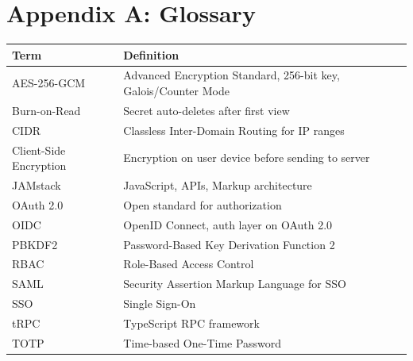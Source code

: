 \documentclass[12pt,a4paper]{article}
\begin{document}
\appendix
\section*{Appendix A: Glossary}

\begin{table}[H]
  \centering
  \small
  \begin{tabular}{@{}p{3.5cm}p{10cm}@{}}
    \toprule
    \textbf{Term}          & \textbf{Definition}                                            \\
    \midrule
    AES-256-GCM            & Advanced Encryption Standard, 256-bit key, Galois/Counter Mode \\
    \hline
    Burn-on-Read           & Secret auto-deletes after first view                           \\
    \hline
    CIDR                   & Classless Inter-Domain Routing for IP ranges                   \\
    \hline
    Client-Side Encryption & Encryption on user device before sending to server             \\
    \hline
    JAMstack               & JavaScript, APIs, Markup architecture                          \\
    \hline
    OAuth 2.0              & Open standard for authorization                                \\
    \hline
    OIDC                   & OpenID Connect, auth layer on OAuth 2.0                        \\
    \hline
    PBKDF2                 & Password-Based Key Derivation Function 2                       \\
    \hline
    RBAC                   & Role-Based Access Control                                      \\
    \hline
    SAML                   & Security Assertion Markup Language for SSO                     \\
    \hline
    SSO                    & Single Sign-On                                                 \\
    \hline
    tRPC                   & TypeScript RPC framework                                       \\
    \hline
    TOTP                   & Time-based One-Time Password                                   \\
    \bottomrule
  \end{tabular}
\end{table}
\end{document}
